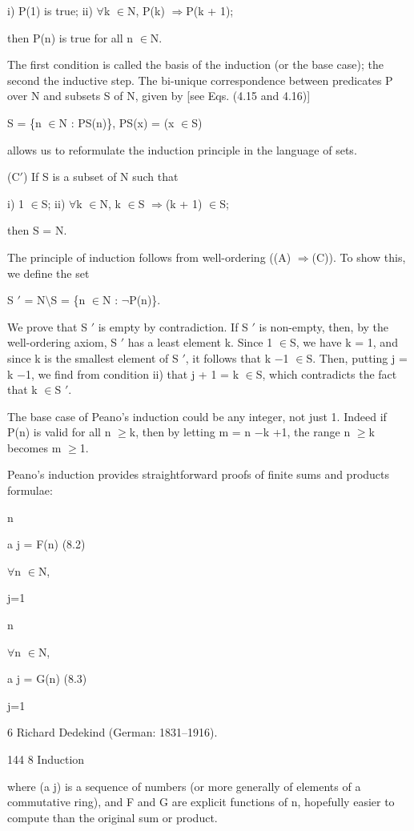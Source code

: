 \documentclass[11pt]{article}
\theoremstyle{plain}
\theoremstyle{definition}
\begin{document}
i) P(1) is true; ii) $\forall$k $\in$N, P(k) $\Rightarrow$P(k + 1);

then P(n) is true for all n $\in$N.

The first condition is called the basis of the induction (or the base case); the second the inductive step. The bi-unique correspondence between predicates P over N and subsets S of N, given by [see Eqs. (4.15 and 4.16)]

S = \{n $\in$N : PS(n)\}, PS(x) = (x $\in$S)

allows us to reformulate the induction principle in the language of sets.

(C$'$) If S is a subset of N such that

i) 1 $\in$S; ii) $\forall$k $\in$N, k $\in$S $\Rightarrow$(k + 1) $\in$S;

then S = N.

The principle of induction follows from well-ordering ((A) $\Rightarrow$(C)). To show this, we define the set

S $'$ = N$\setminus$S = \{n $\in$N : $\neg$P(n)\}.

We prove that S $'$ is empty by contradiction. If S $'$ is non-empty, then, by the well-ordering axiom, S $'$ has a least element k. Since 1 $\in$S, we have k = 1, and since k is the smallest element of S $'$, it follows that k $-$1 $\in$S. Then, putting j = k $-$1, we find from condition ii) that j + 1 = k $\in$S, which contradicts the fact that k $\in$S $'$.

The base case of Peano's induction could be any integer, not just 1. Indeed if P(n) is valid for all n $\geq$k, then by letting m = n $-$k +1, the range n $\geq$k becomes m $\geq$1.

Peano's induction provides straightforward proofs of finite sums and products formulae:

n

a j = F(n) (8.2)

$\forall$n $\in$N,

j=1

n

$\forall$n $\in$N,

a j = G(n) (8.3)

j=1

6 Richard Dedekind (German: 1831--1916).

144 8 Induction

where (a j) is a sequence of numbers (or more generally of elements of a commutative ring), and F and G are explicit functions of n, hopefully easier to compute than the original sum or product.
\end{document}
